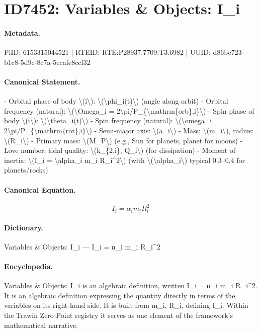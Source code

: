 \section*{ID7452: Variables \& Objects: I\_i}
\paragraph{Metadata.}
PiID: 6153315044521 | RTEID: RTE:P28937.7709:T3.6982 | UUID: d86bc723-b1c8-5d9c-8c7a-5ccafe8ccf32

\paragraph{Canonical Statement.}
- Orbital phase of body \textbackslash{}(i\textbackslash{}): \textbackslash{}(\textbackslash{}phi\_i(t)\textbackslash{}) (angle along orbit) - Orbital frequency (natural): \textbackslash{}(\textbackslash{}Omega\_i = 2\textbackslash{}pi/P\_\{\textbackslash{}mathrm\{orb\},i\}\textbackslash{}) - Spin phase of body \textbackslash{}(i\textbackslash{}): \textbackslash{}(\textbackslash{}theta\_i(t)\textbackslash{}) - Spin frequency (natural): \textbackslash{}(\textbackslash{}omega\_i = 2\textbackslash{}pi/P\_\{\textbackslash{}mathrm\{rot\},i\}\textbackslash{}) - Semi-major axis: \textbackslash{}(a\_i\textbackslash{}) - Mass: \textbackslash{}(m\_i\textbackslash{}), radius: \textbackslash{}(R\_i\textbackslash{}) - Primary mass: \textbackslash{}(M\_P\textbackslash{}) (e.g., Sun for planets, planet for moons) - Love number, tidal quality: \textbackslash{}(k\_\{2,i\}, Q\_i\textbackslash{}) (for dissipation) - Moment of inertia: \textbackslash{}(I\_i = \textbackslash{}alpha\_i m\_i R\_i\textasciicircum{}2\textbackslash{}) (with \textbackslash{}(\textbackslash{}alpha\_i\textbackslash{}) typical 0.3–0.4 for planets/rocks)

\paragraph{Canonical Equation.}
\[
I_i = \alpha_i m_i R_i^2
\]

\paragraph{Dictionary.}
Variables \& Objects: I\_i — I\_i = α\_i m\_i R\_i\textasciicircum{}2

\paragraph{Encyclopedia.}
Variables \& Objects: I\_i is an algebraic definition, written I\_i = α\_i m\_i R\_i\textasciicircum{}2. It is an algebraic definition expressing the quantity directly in terms of the variables on its right-hand side. It is built from m\_i, R\_i, defining I\_i. Within the Trawin Zero Point registry it serves as one element of the framework's mathematical narrative.
